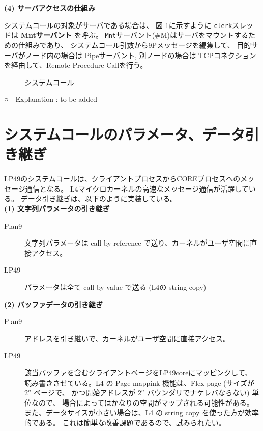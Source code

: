 {{\bf\flushleft (4) サーバアクセスの仕組み }

    システムコールの対象がサーバである場合は、
    図 \ref{fig:LP49syscall}に示すように
    {\tt clerk}スレッドは {\bf Mntサーバント} を呼ぶ。
    {\tt Mnt}サーバント(\#M)はサーバをマウントするための仕組みであり、
   システムコール引数から9Pメッセージを編集して、
    目的サーバがノード内の場合は Pipeサーバント,
    別ノードの場合は TCPコネクションを経由して、Remote Procedure Callを行う。



\begin{figure}[htb]
  \begin{center}
   \epsfxsize=440pt
    \caption{システムコール}
    \label{fig:LP49syscall}
  \end{center}
\end{figure}

    


○　Explanation : to be added

\vspace{4cm}

 
\section{システムコールのパラメータ、データ引き継ぎ}

   LP49のシステムコールは、クライアントプロセスからCOREプロセスへのメッセージ通信となる。
L4マイクロカーネルの高速なメッセージ通信が活躍している。
データ引き継ぎは、以下のように実装している。
\\

{\bf\flushleft (1) 文字列パラメータの引き継ぎ}

\begin{description}
    \item[Plan9]  文字列パラメータは call-by-reference で送り、カーネルがユーザ空間に直接アクセス。
    \item[LP49]  パラメータは全て call-by-value で送る  (L4の string copy)
\end{description}


{\bf\flushleft  (2) バッファデータの引き継ぎ}

  \begin{description}
     \item[Plan9] アドレスを引き継いで、カーネルがユーザ空間に直接アクセス。
     \item[LP49]  該当バッファを含むクライアントページをLP49coreにマッピンクして、
         読み書きさせている。L4 の Page mappink 機能は、Flex page  
         (サイズが $2^n$ ページで、
         かつ開始アドレスが $2^n$ バウンダリでナケレバならない) 単位なので、
         場合によってはかなりの空間がマップされる可能性がある。
        また、データサイスが小さい場合は、L4 の string copy を使った方が効率的である。
        これは簡単な改善課題であるので、試みられたい。
  \end{description}




}
